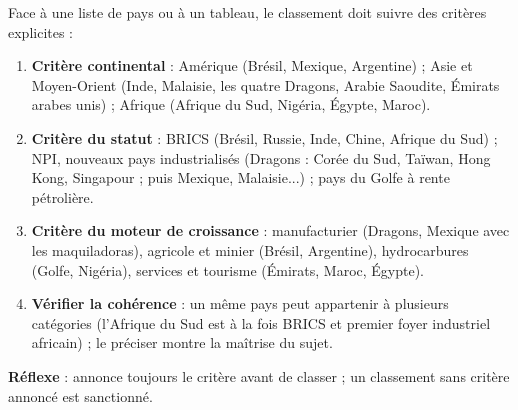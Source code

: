 \documentclass[11pt]{article}
\begin{document}
\begin{methode}
Face à une liste de pays ou à un tableau, le classement doit suivre des critères explicites :
\begin{enumerate}
\item \textbf{Critère continental} : Amérique (Brésil, Mexique, Argentine) ; Asie et Moyen-Orient (Inde, Malaisie, les quatre Dragons, Arabie Saoudite, Émirats arabes unis) ; Afrique (Afrique du Sud, Nigéria, Égypte, Maroc).
\item \textbf{Critère du statut} : BRICS (Brésil, Russie, Inde, Chine, Afrique du Sud) ; NPI, nouveaux pays industrialisés (Dragons : Corée du Sud, Taïwan, Hong Kong, Singapour ; puis Mexique, Malaisie...) ; pays du Golfe à rente pétrolière.
\item \textbf{Critère du moteur de croissance} : manufacturier (Dragons, Mexique avec les maquiladoras), agricole et minier (Brésil, Argentine), hydrocarbures (Golfe, Nigéria), services et tourisme (Émirats, Maroc, Égypte).
\item \textbf{Vérifier la cohérence} : un même pays peut appartenir à plusieurs catégories (l'Afrique du Sud est à la fois BRICS et premier foyer industriel africain) ; le préciser montre la maîtrise du sujet.
\end{enumerate}
\textbf{Réflexe} : annonce toujours le critère avant de classer ; un classement sans critère annoncé est sanctionné.
\end{methode}
\end{document}
